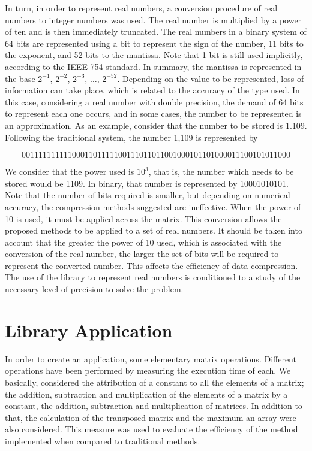 \documentclass[10pt]{article}
\begin{document}
In turn, in order to represent real numbers, a conversion procedure of real numbers to integer numbers was used. The 
real number is multiplied by a power of ten and is then immediately truncated. The real numbers in a binary system of 64 
bits are represented using a bit to represent the sign of the number, 11 bits to the exponent, and 52 bits to the 
mantissa. Note that 1 bit is still used implicitly, according to the IEEE-754 standard. In summary, the mantissa is 
represented in the base $2^{-1}$, $2^{-2}$, $2^{-3}$, $\hdots$, $2^{-52}$. Depending on the value to be represented, 
loss of information can take place, which is related to the accuracy of the type used. In this case, considering a real 
number with double precision, the demand of 64 bits to represent each one occurs, and in some cases, the number to be 
represented is an approximation. As an example, consider that the number to be stored is 1.109. Following the 
traditional system, the number 1,109 is represented by

\begin{equation}\nonumber
  0011111111110001101111100111011011001000101101000011100101011000
\end{equation}

We consider that the power used is $10^3$, that is, the number which needs to be stored would be 1109. In binary, that 
number is represented by 10001010101. Note that the number of bits required is smaller, but depending on numerical 
accuracy, the compression methods suggested are ineffective. When the power of 10 is used, it must be applied across the 
matrix. This conversion allows the proposed methods to be applied to a set of real numbers. It should be taken into 
account that the greater the power of 10 used, which is associated with the conversion of the real number, the larger 
the set of bits will be required to represent the converted number. This affects the efficiency of data compression. The 
use of the library to represent real numbers is conditioned to a study of the necessary level of precision to solve the 
problem.


\section*{Library Application}

In order to create an application, some elementary matrix operations. Different operations have been performed by 
measuring the execution time of each. We basically, considered the attribution of a constant to all the elements of a 
matrix; the addition, subtraction and multiplication of the elements of a matrix by a constant, the addition, 
subtraction and multiplication of matrices. In addition to that, the calculation of  the transposed matrix and the 
maximum an array were also considered. This measure was used to evaluate the efficiency of the method implemented when 
compared to traditional methods.
\end{document}
